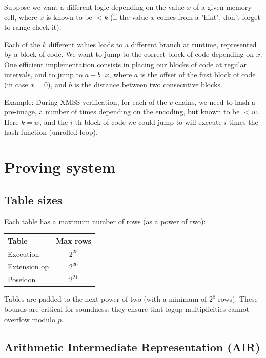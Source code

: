 \documentclass{article}
\theoremstyle{definition}
\begin{document}
Suppose we want a different logic depending on the value $x$ of a given memory cell, where $x$ is known to be $< k$ (if the value $x$ comes from a "hint", don't forget to range-check it).

Each of the $k$ different values leads to a different branch at runtime, represented by a block of code. We want to jump to the correct block of code depending on $x$.
One efficient implementation consists in placing our blocks of code at regular intervals, and to jump to $a + b \cdot x$, where $a$ is the offset of the first block of code (in case $x = 0$), and $b$ is the distance between two consecutive blocks.

Example: During XMSS verification, for each of the $v$ chains, we need to hash a pre-image, a number of times depending on the encoding, but known to be $< w$. Here $k = w$, and the $i$-th block of code we could jump to will execute $i$ times the hash function (unrolled loop).

\section{Proving system}\label{sec:proving}

\subsection{Table sizes}\label{sec:table-sizes}

Each table has a maximum number of rows (as a power of two):

\begin{center}
\begin{tabular}{lc}
\toprule
Table & Max rows \\
\midrule
Execution & $2^{25}$ \\
Extension op & $2^{20}$ \\
Poseidon & $2^{21}$ \\
\bottomrule
\end{tabular}
\end{center}

Tables are padded to the next power of two (with a minimum of $2^{8}$ rows). These bounds are critical for soundness: they ensure that logup multiplicities cannot overflow modulo $p$.

\subsection{Arithmetic Intermediate Representation (AIR)}\label{sec:air-eval}
\end{document}
